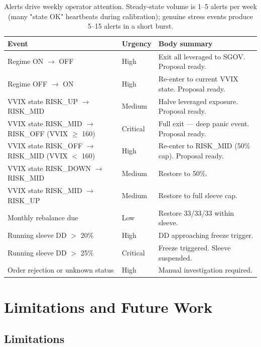 \documentclass[11pt,a4paper]{article}
\begin{document}
\begin{table}[H]
\centering
\small
\begin{tabular}{lll}
\toprule
\textbf{Event} & \textbf{Urgency} & \textbf{Body summary} \\
\midrule
Regime ON $\to$ OFF               & High   & Exit all leveraged to SGOV. Proposal ready. \\
Regime OFF $\to$ ON               & High   & Re-enter to current VVIX state. Proposal ready. \\
VVIX state RISK\_UP $\to$ RISK\_MID  & Medium & Halve leveraged exposure. Proposal ready. \\
VVIX state RISK\_MID $\to$ RISK\_OFF (VVIX $\geq$ 160) & Critical & Full exit --- deep panic event. Proposal ready. \\
VVIX state RISK\_OFF $\to$ RISK\_MID (VVIX $<$ 160) & High & Re-enter to RISK\_MID (50\% cap). Proposal ready. \\
VVIX state RISK\_DOWN $\to$ RISK\_MID & Medium & Restore to 50\%. \\
VVIX state RISK\_MID $\to$ RISK\_UP   & Medium & Restore to full sleeve cap. \\
Monthly rebalance due             & Low    & Restore 33/33/33 within sleeve. \\
Running sleeve DD $>$ 20\%        & High   & DD approaching freeze trigger. \\
Running sleeve DD $>$ 25\%        & Critical & Freeze triggered. Sleeve suspended. \\
Order rejection or unknown status & High   & Manual investigation required. \\
\bottomrule
\end{tabular}
\caption{Alerts drive weekly operator attention. Steady-state volume is 1--5 alerts per week (many "state OK" heartbeats during calibration); genuine stress events produce 5--15 alerts in a short burst.}
\end{table}

\section{Limitations and Future Work}

\subsection{Limitations}
\end{document}
